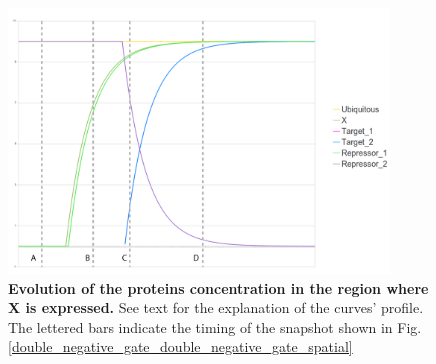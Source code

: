 \begin{figure}
\begin{center}
\includegraphics[width=0.9\textwidth]{../../images/Cases_Studies/Case_theo_grn/double_negative_gate/double_negative_gate_plot2_letter.png}
\end{center}
\caption{\textbf{Evolution of the proteins concentration in the region where X is expressed.} See text for the explanation of the curves' profile. The lettered bars indicate the timing of the snapshot shown in Fig. \ref{double_negative_gate_double_negative_gate_spatial}}
\label{double_negative_gate_dng_grn_plot2}
\end{figure}
